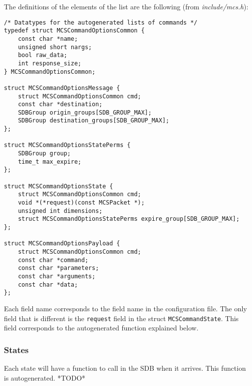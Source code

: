 \documentclass[12pt,a4paper]{report}
\begin{document}
The definitions of the elements of the list are the following (from \textit{include/mcs.h}):
\begin{lstlisting}
/* Datatypes for the autogenerated lists of commands */
typedef struct MCSCommandOptionsCommon {
    const char *name;
    unsigned short nargs;
    bool raw_data;
    int response_size;
} MCSCommandOptionsCommon;

struct MCSCommandOptionsMessage {
    struct MCSCommandOptionsCommon cmd;
    const char *destination;
    SDBGroup origin_groups[SDB_GROUP_MAX];
    SDBGroup destination_groups[SDB_GROUP_MAX];
};

struct MCSCommandOptionsStatePerms {
    SDBGroup group;
    time_t max_expire;
};

struct MCSCommandOptionsState {
    struct MCSCommandOptionsCommon cmd;
    void *(*request)(const MCSPacket *);
    unsigned int dimensions;
    struct MCSCommandOptionsStatePerms expire_group[SDB_GROUP_MAX];
};

struct MCSCommandOptionsPayload {
    struct MCSCommandOptionsCommon cmd;
    const char *command;
    const char *parameters;
    const char *arguments;
    const char *data;
};
\end{lstlisting}

Each field name corresponds to the field name in the configuration file. The only field that is different is the \texttt{request} field in the struct \texttt{MCSCommandState}. This field corresponds to the autogenerated function explained below.

\subsubsection*{States}
Each state will have a function to call in the SDB when it arrives. This function is autogenerated.
*TODO*
\end{document}
